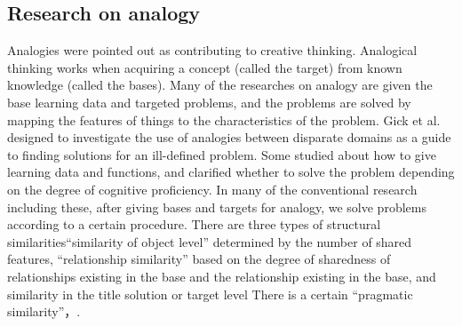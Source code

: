 \documentclass[journal]{IAENGtran}
\begin{document}
\subsection{Research on analogy}
\label{subsec:Research on analogy}

Analogies were pointed out as contributing to creative thinking\cite{Codd04}.
Analogical thinking works when acquiring a concept (called the target) from known knowledge (called the bases)\cite{Codd05}.
Many of the researches on analogy are given the base learning data and targeted problems, and the problems are solved by mapping the features of things to the characteristics of the problem\cite{Codd06}.
Gick et al. designed to investigate the use of analogies between disparate domains as a guide to finding solutions for an ill-defined problem.
Some studied about how to give learning data and functions\cite{Codd07}, and clarified whether to solve the problem depending on the degree of cognitive proficiency\cite{Codd08}.
In many of the conventional research including these, after giving bases and targets for analogy, we solve problems according to a certain procedure.
There are three types of structural similarities``similarity of object level'' determined by the number of shared features, ``relationship similarity'' based on the degree of sharedness of relationships existing in the base and the relationship existing in the base, and similarity in the title solution or target level There is a certain ``pragmatic similarity''\cite{Codd05}，\cite{Codd09}.
\end{document}
